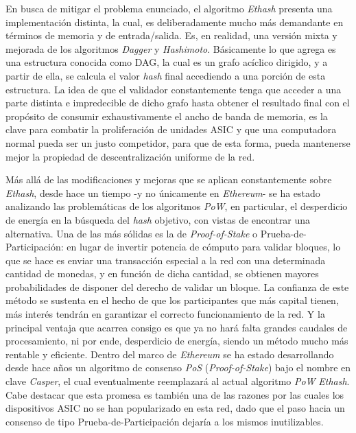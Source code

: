  En busca de mitigar el problema enunciado, el algoritmo \textit{Ethash} presenta una implementación distinta, la cual, es deliberadamente mucho más demandante en términos de memoria y de entrada/salida. Es, en realidad, una versión mixta y mejorada de los algoritmos \textit{Dagger}\cite{buterin2013dagger} y \textit{Hashimoto}\cite{dryja2014hashimoto}. Básicamente lo que agrega es una estructura conocida como DAG, la cual es un grafo acíclico dirigido, y a partir de ella, se calcula el valor \textit{hash} final accediendo a una porción de esta estructura. La idea de que el validador constantemente tenga que acceder a una parte distinta e impredecible de dicho grafo hasta obtener el resultado final con el propósito de consumir exhaustivamente el ancho de banda de memoria, es la clave para combatir la proliferación de unidades ASIC y que una computadora normal pueda ser un justo competidor, para que de esta forma, pueda mantenerse mejor la propiedad de descentralización uniforme de la red.

 Más allá de las modificaciones y mejoras que se aplican constantemente sobre \textit{Ethash}, desde hace un tiempo -y no únicamente en \textit{Ethereum}- se ha estado analizando las problemáticas de los algoritmos \textit{PoW}, en particular, el desperdicio de energía en la búsqueda del \textit{hash} objetivo, con vistas de encontrar una alternativa. Una de las más sólidas es la de \textit{Proof-of-Stake} o Prueba-de-Participación: en lugar de invertir potencia de cómputo para validar bloques, lo que se hace es enviar una transacción especial a la red con una determinada cantidad de monedas, y en función de dicha cantidad, se obtienen mayores probabilidades de disponer del derecho de validar un bloque. La confianza de este método se sustenta en el hecho de que los participantes que más capital tienen, más interés tendrán en garantizar el correcto funcionamiento de la red. Y la principal ventaja que acarrea consigo es que ya no hará falta grandes caudales de procesamiento, ni por ende, desperdicio de energía, siendo un método mucho más rentable y eficiente. Dentro del marco de \textit{Ethereum} se ha estado desarrollando desde hace años un algoritmo de consenso \textit{PoS} (\textit{Proof-of-Stake}) bajo el nombre en clave \textit{Casper}\cite{zamfir2017casper}, el cual eventualmente reemplazará al actual algoritmo \textit{PoW} \textit{Ethash}. Cabe destacar que esta promesa es también una de las razones por las cuales los dispositivos ASIC no se han popularizado en esta red, dado que el paso hacia un consenso de tipo Prueba-de-Participación dejaría a los mismos inutilizables.

